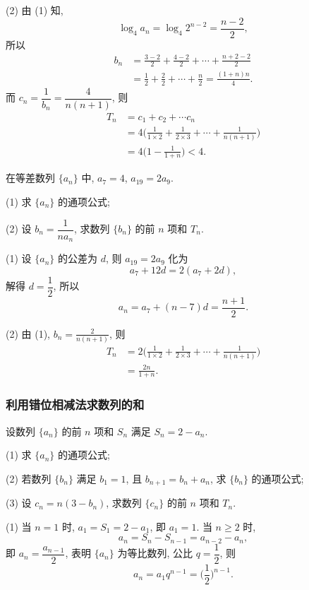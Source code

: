     (2) 由 (1) 知,
    \[\log_4 a_n= \log_4 2^{n-2}= \frac{n-2}2,\]
    所以
    \[\begin{aligned}
        b_n&= \frac{3-2}2+ \frac{4-2}2+\cdots +\frac{n+2-2}2\\
        &= \frac12+ \frac22+\cdots +\frac{n}2
         = \frac{(1+n)n}{4}.
    \end{aligned}\]
    而 $c_n= \dfrac1{b_n}= \dfrac4{n(n+1)}$, 则
    \[\begin{aligned}
        T_n&= c_1+ c_2+\cdots c_n\\
        &= 4\biggl(\frac1{1\times2}+ \frac1{2\times3}+\cdots 
            +\frac1{n(n+1)}\biggr)\\
        &= 4\biggl(1-\frac1{1+n}\biggr)< 4.
    \end{aligned}\]
\endsolution

\lianxi
\begin{exercise}[s]
    在等差数列 $\{a_n\}$ 中, $a_7=4$, $a_{19}= 2a_9$.
    
    (1) 求 $\{a_n\}$ 的通项公式;
    
    (2) 设 $b_n =\dfrac1{n a_n}$, 求数列 $\{b_n\}$ 的前 $n$ 项和 $T_n$.
\end{exercise}
\beginsolution
    (1) 设 $\{a_n\}$ 的公差为 $d$, 则 $a_{19}= 2a_9$ 化为
    \[a_7+ 12d= 2(a_7+2d),\]
    解得 $d= \dfrac12$, 所以
    \[a_n= a_7+(n-7)d= \frac{n+1}2.\]

    (2) 由 (1), $b_n= \frac2{n(n+1)}$, 则
    \[\begin{aligned}
        T_n&= 2\biggl(\frac1{1\times2}+ \frac1{2\times3}
            +\cdots +\frac1{n(n+1)}\biggr)\\
        &= \frac{2n}{1+n}.
    \end{aligned}\]
\endsolution

\subsubsection{利用错位相减法求数列的和}
\begin{example}
    设数列 $\{a_n\}$ 的前 $n$ 项和 $S_n$ 满足 $S_n=2-a_n$.
    
    (1) 求 $\{a_n\}$ 的通项公式;
    
    (2) 若数列 $\{b_n\}$ 满足 $b_1=1$, 且 $b_{n+1} =b_n +a_n$, 
    求 $\{b_n\}$ 的通项公式;
    
    (3) 设 $c_n= n(3-b_n)$, 求数列 $\{c_n\}$ 的前 $n$ 项和 $T_n$.
\end{example}
\beginsolution
    (1) 当 $n=1$ 时, $a_1= S_1= 2-a_1$, 即 $a_1=1$. 当 $n\geqslant 2$ 时,
    \[a_n= S_n- S_{n-1}= a_{n-2}- a_n,\]
    即 $a_n= \dfrac{a_{n-1}}2$, 表明 $\{a_n\}$ 为等比数列, 公比 $q= \dfrac12$, 则
    \[a_n= a_1 q^{n-1}= \biggl(\frac12\biggr)^{n-1}.\]

